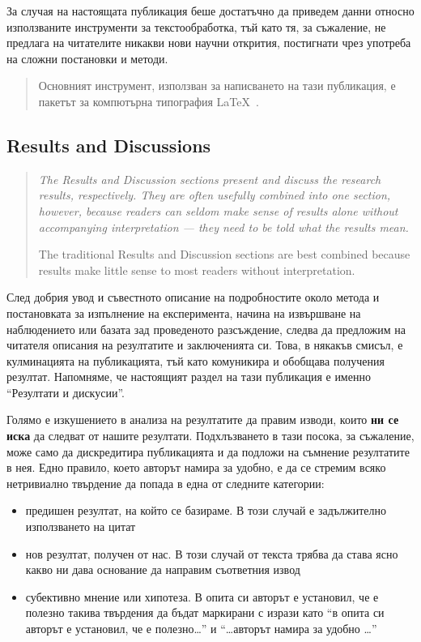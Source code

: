 \documentclass[11pt, oneside]{article}     %
\newenvironment{quotenature}{\begin{quote}\itshape}{\cite{nature}\end{quote}}
\begin{document}
За случая на настоящата публикация беше достатъчно да приведем данни относно използваните инструменти за текстообработка, тъй като тя, за съжаление, не предлага на читателите никакви нови научни открития, постигнати чрез употреба на сложни постановки и методи.

\begin{quote}
  Основният инструмент, използван за написването на тази публикация, е
  пакетът за компютърна типография \LaTeX\ \cite{latex}.
\end{quote}

\subsection*{Results and Discussions}

\begin{quotenature}
  The Results and Discussion sections present and discuss the research results, respectively. They are often usefully combined into one section, however, because readers can seldom make sense of results alone without accompanying interpretation — they need to be told what the results mean.

  The traditional Results and Discussion sections are best combined
  because results make little sense to most readers without
  interpretation.
\end{quotenature}

След добрия увод и съвестното описание на подробностите около метода и постановката за изпълнение на експеримента, начина на извършване на наблюдението или базата зад проведеното разсъждение, следва да предложим на читателя описания на резултатите и заключенията си. Това, в някакъв смисъл, е кулминацията на публикацията, тъй като комуникира и обобщава получения резултат. Напомняме, че настоящият раздел на тази публикация е именно ``Резултати и дискусии''.

Голямо е изкушението в анализа на резултатите да правим изводи, които \textbf{ни се иска} да следват от нашите резултати. Подхлъзването в тази посока, за съжаление, може само да дискредитира публикацията и да подложи на съмнение резултатите в нея. Едно правило, което авторът намира за удобно, е да се стремим всяко нетривиално твърдение 
да попада в една от следните категории:
\begin{itemize}
\item предишен резултат, на който се базираме. В този случай е задължително използването на цитат \cite{citationneeded}
\item нов резултат, получен от нас. В този случай от текста трябва да става ясно какво ни дава основание да направим съответния извод
\item субективно мнение или хипотеза. В опита си авторът е установил, че е полезно такива твърдения да бъдат маркирани с изрази като ``в опита си авторът е установил, че е полезно\ldots'' и ``\ldots авторът намира за удобно \ldots''
\end{itemize}
\end{document}
